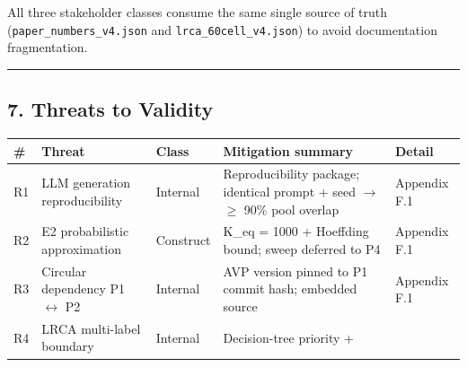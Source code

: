 \documentclass[review,12pt,authoryear]{elsarticle}
\newcounter{none}                   %
\begin{document}
All three stakeholder classes consume the same single source of truth
(\texttt{paper\_numbers\_v4.json} and \texttt{lrca\_60cell\_v4.json}) to
avoid documentation fragmentation.

\begin{center}\rule{0.5\linewidth}{0.5pt}\end{center}

\subsection{7. Threats to Validity}\label{threats-to-validity}

{\def\LTcaptype{none} %
\begin{longtable}[]{@{}
  >{\raggedright\arraybackslash}p{}
  >{\raggedright\arraybackslash}p{}
  >{\raggedright\arraybackslash}p{}
  >{\raggedright\arraybackslash}p{}
  >{\raggedright\arraybackslash}p{}@{}}
\toprule\noalign{}
\begin{minipage}[b]{\linewidth}\raggedright
\#
\end{minipage} & \begin{minipage}[b]{\linewidth}\raggedright
Threat
\end{minipage} & \begin{minipage}[b]{\linewidth}\raggedright
Class
\end{minipage} & \begin{minipage}[b]{\linewidth}\raggedright
Mitigation summary
\end{minipage} & \begin{minipage}[b]{\linewidth}\raggedright
Detail
\end{minipage} \\
\midrule\noalign{}
\endhead
\bottomrule\noalign{}
\endlastfoot
R1 & LLM generation reproducibility & Internal & Reproducibility
package; identical prompt + seed $\to$ $\geq$ 90\% pool overlap & Appendix F.1 \\
R2 & E2 probabilistic approximation & Construct & K\_eq = 1000 +
Hoeffding bound; sweep deferred to P4 & Appendix F.1 \\
R3 & Circular dependency P1 $\leftrightarrow$ P2 & Internal & AVP version pinned to P1
commit hash; embedded source & Appendix F.1 \\
R4 & LRCA multi-label boundary & Internal & Decision-tree priority +

\end{longtable}}
\end{document}
